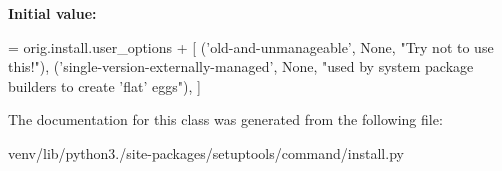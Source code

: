 {\bfseries Initial value\+:}
\begin{DoxyCode}
=  orig.install.user\_options + [
        (\textcolor{stringliteral}{'old-and-unmanageable'}, \textcolor{keywordtype}{None}, \textcolor{stringliteral}{"Try not to use this!"}),
        (\textcolor{stringliteral}{'single-version-externally-managed'}, \textcolor{keywordtype}{None},
         \textcolor{stringliteral}{"used by system package builders to create 'flat' eggs"}),
    ]
\end{DoxyCode}


The documentation for this class was generated from the following file\+:\begin{DoxyCompactItemize}
\item 
venv/lib/python3./site-\/packages/setuptools/command/install.\+py\end{DoxyCompactItemize}
